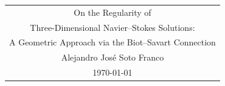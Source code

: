 \documentclass[11pt,a4paper,openany]{book}
\begin{document}
\frontmatter

\begin{titlepage}
  \null\vfill
  \begin{center}
  \begin{tabular}{@{}c@{}}
    {\LARGE On the Regularity of} \\[6pt]
    {\LARGE Three-Dimensional Navier--Stokes Solutions:} \\[6pt]
    {\LARGE A Geometric Approach via the Biot--Savart Connection} \\[24pt]
    {\large Alejandro Jos\'e Soto Franco} \\[12pt]
    {\large \today}
  \end{tabular}
  \end{center}
  \vfill\vfill\null
\end{titlepage}
\tableofcontents


\let\origcleardoublepage\cleardoublepage
\let\cleardoublepage\clearpage
\mainmatter
\let\cleardoublepage\origcleardoublepage








\appendix





\backmatter
\printbibliography
\end{document}
